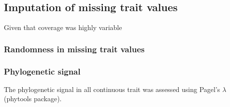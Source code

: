 \subsection{Imputation of missing trait values}
Given that coverage was highly variable 



\subsubsection{Randomness in missing trait values}



\subsubsection{Phylogenetic signal}
The phylogenetic signal in all continuous trait was assessed using Pagel's $\lambda$ (phytools package). 

